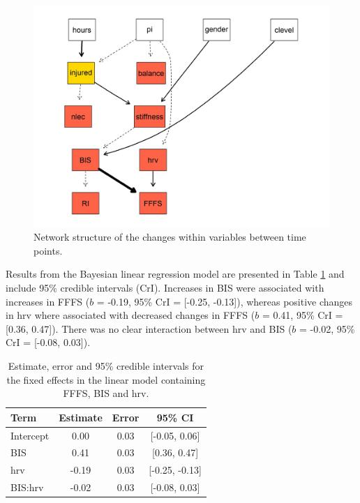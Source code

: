 \documentclass[
  english,
  man]{apa6}
\begin{document}
\begin{figure}

{\centering \includegraphics[width=1\linewidth]{figures_doc/Fig4} 

}

\caption{Network structure of the changes within variables between time points.}\label{fig:fig4}
\end{figure}

Results from the Bayesian linear regression model are presented in Table \ref{tab:table8} and include 95\% credible intervals (CrI).
Increases in BIS were associated with increases in FFFS (\(b\) = -0.19, 95\% CrI = {[}-0.25, -0.13{]}), whereas positive changes in hrv where associated with decreased changes in FFFS (\(b\) = 0.41, 95\% CrI = {[}0.36, 0.47{]}).
There was no clear interaction between hrv and BIS (\(b\) = -0.02, 95\% CrI = {[}-0.08, 0.03{]}).

\begin{table}[H]

\caption{\label{tab:table8}Estimate, error and 95\% credible intervals for the fixed effects in the linear model containing FFFS, BIS and hrv.}
\centering
\begin{tabular}[t]{l|c|c|c}
\hline
\textbf{Term} & \textbf{Estimate} & \textbf{Error} & \textbf{95\% CI}\\
\hline
Intercept & 0.00 & 0.03 & [-0.05, 0.06]\\
\hline
BIS & 0.41 & 0.03 & [0.36, 0.47]\\
\hline
hrv & -0.19 & 0.03 & [-0.25, -0.13]\\
\hline
BIS:hrv & -0.02 & 0.03 & [-0.08, 0.03]\\
\hline
\end{tabular}
\end{table}
\end{document}
